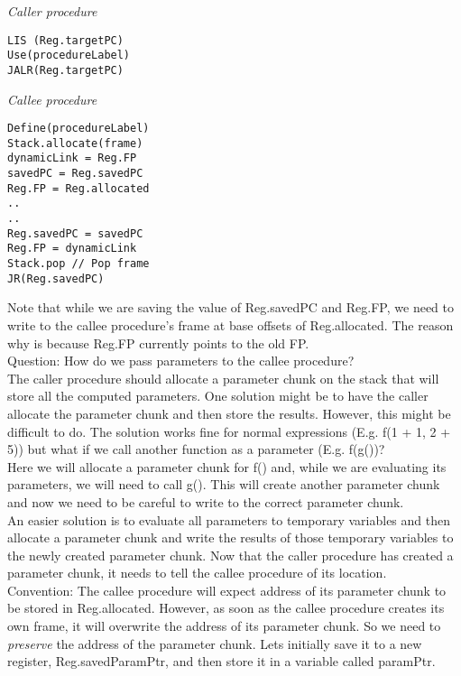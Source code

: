 \documentclass[12pt, letterpaper]{article}
\begin{document}
\begin{minipage}[t]{0.5\textwidth}
\emph{Caller procedure}
\begin{verbatim}
LIS (Reg.targetPC)
Use(procedureLabel)
JALR(Reg.targetPC)
\end{verbatim}
\end{minipage}
\begin{minipage}[t]{0.5\textwidth}
\emph{Callee procedure}
\begin{verbatim}
Define(procedureLabel)
Stack.allocate(frame)
dynamicLink = Reg.FP
savedPC = Reg.savedPC
Reg.FP = Reg.allocated
..
..
Reg.savedPC = savedPC
Reg.FP = dynamicLink
Stack.pop // Pop frame
JR(Reg.savedPC)
\end{verbatim}
\end{minipage}

\vspace{7mm}
Note that while we are saving the value of Reg.savedPC and Reg.FP, we need to write to the callee procedure's frame at base offsets of Reg.allocated. The reason why is because Reg.FP currently points to the old FP.\\

Question: How do we pass parameters to the callee procedure?\\

The caller procedure should allocate a parameter chunk on the stack that will store all the computed parameters. One solution might be to have the caller allocate the parameter chunk and then store the results. However, this might be difficult to do. The solution works fine for normal expressions (E.g. f(1 + 1, 2 + 5)) but what if we call another function as a parameter (E.g. f(g())?\\

Here we will allocate a parameter chunk for f() and, while we are evaluating its parameters, we will need to call g(). This will create another parameter chunk and now we need to be careful to write to the correct parameter chunk.\\

An easier solution is to evaluate all parameters to temporary variables and then allocate a parameter chunk and write the results of those temporary variables to the newly created parameter chunk. Now that the caller procedure has created a parameter chunk, it needs to tell the callee procedure of its location.\\

Convention: The callee procedure will expect address of its parameter chunk to be stored in Reg.allocated. However, as soon as the callee procedure creates its own frame, it will overwrite the address of its parameter chunk. So we need to \emph{preserve} the address of the parameter chunk. Lets initially save it to a new register, Reg.savedParamPtr, and then store it in a variable called paramPtr.\\
\end{document}
